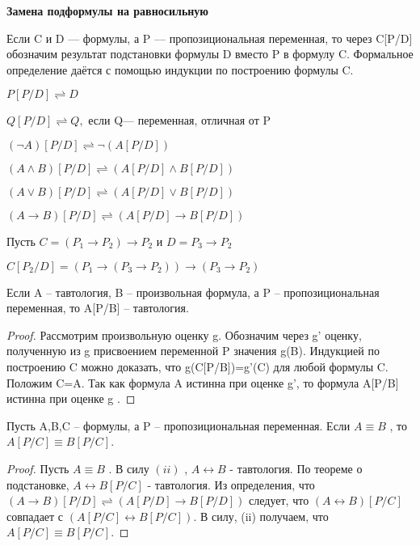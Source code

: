 \begin{center}
 \textbf{Замена подформулы на равносильную}
\end{center}
{ Если C и D — формулы, а P — пропозициональная
переменная, то через C[P/D] обозначим результат подстановки формулы D вместо P в формулу C.
Формальное определение даётся с помощью индукции по построению
формулы C.
}
\begin{center}
{

}
$P[P / D] \rightleftharpoons D$ {

}
$Q[P / D] \rightleftharpoons Q,$ если Q— переменная, отличная от P {

}
$(\neg A)[P / D] \rightleftharpoons \neg(A[P / D]) $ {

}
$(A \wedge B)[P / D] \rightleftharpoons(A[P / D] \wedge B[P / D])$ {

}
$(A \vee B)[P / D] \rightleftharpoons(A[P / D] \vee B[P / D])$ {

}
$(A \rightarrow B)[P / D] \rightleftharpoons(A[P / D] \rightarrow B[P / D])${

}

\end{center}

\begin{example}
Пусть $C=\left(P_{1} \rightarrow P_{2}\right) \rightarrow P_{2} $ и $D=P_{3} \rightarrow P_{2}$
{

}
$C\left[P_{2} / D\right]=\left(P_{1} \rightarrow\left(P_{3} \rightarrow P_{2}\right)\right) \rightarrow\left(P_{3} \rightarrow P_{2}\right)  $

\end{example}


\begin{theorem}[О подставновке]
Если A -- тавтология, B -- произвольная формула, а P -- пропозициональная переменная, то A[P/B] -- тавтология.
\end{theorem}
\begin{proof}
Рассмотрим произвольную оценку g. Обозначим через g' оценку, полученную из g присвоением переменной P значения
g(B). Индукцией по построению C можно доказать, что
g(C[P/B])=g'(C)  для любой формулы C. Положим C=A. Так как формула A истинна при оценке g', то формула A[P/B] истинна при оценке g .
\end{proof}

\begin{theorem}
Пусть A,B,C -- формулы, а P -- пропозициональная
переменная. Если ${A}\equiv{B}$ , то $A[P/C] \equiv B[P/C]$.
\end{theorem}
\begin{proof}
Пусть $ {A}\equiv{B} $ . В силу $(ii)$ ,  ${A}\leftrightarrow{B}$  - тавтология. По теореме о подстановке, ${A}\leftrightarrow{B}[P/C]$ - тавтология.
Из определения, что $(A \rightarrow B)[P / D] \rightleftharpoons(A[P / D] \rightarrow B[P / D])$  следует, что $(A \leftrightarrow B)[P / C] $ совпадает с 
$(A[P / C] \leftrightarrow B[P / C])$. В силу, (ii) получаем, что $A[P/C] \equiv B[P/C]$.
\end{proof}


